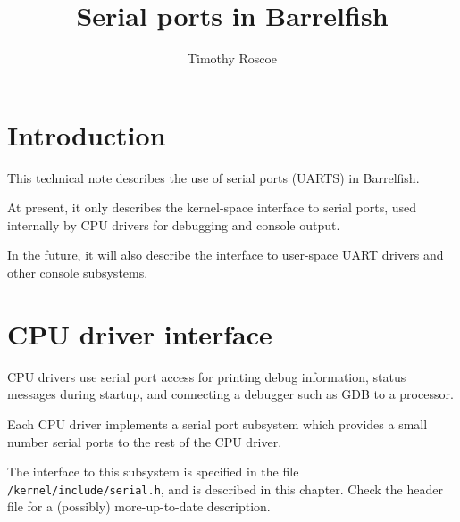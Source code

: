 \documentclass[a4paper,twoside]{report} %
\title{Serial ports in Barrelfish}   %
\author{Timothy Roscoe}	%
\begin{document}
\maketitle

%
%
\begin{versionhistory}
\end{versionhistory}



\newcommand{\note}[1]{[\textcolor{red}{\emph{#1}}]}
\newcommand{\Intf}{\texttt{/kernel/include/serial.h}\xspace}

\tableofcontents

\chapter{Introduction}

This technical note describes the use of serial ports (UARTS) in
Barrelfish.  

At present, it only describes the kernel-space interface
to serial ports, used internally by CPU drivers for debugging and
console output.  

In the future, it will also describe the interface to user-space UART
drivers and other console subsystems. 

\chapter{CPU driver interface}\label{cha:cpudriver}

CPU drivers use serial port access for printing debug information,
status messages during startup, and connecting a debugger such as GDB
to a processor. 

Each CPU driver implements a serial port subsystem which provides a
small number serial ports to the rest of the CPU driver.  

The interface to this subsystem is specified in the file
\Intf, and is described in this chapter.
Check the header file for a (possibly) more-up-to-date description. 
\end{document}
